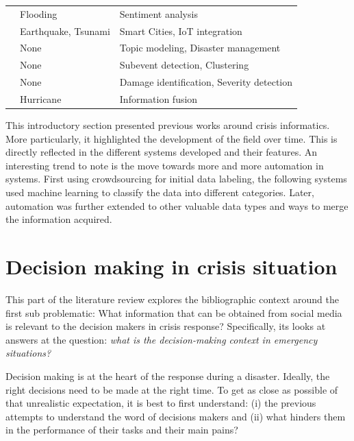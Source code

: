\begin{table}[bp]
\begin{tabular}{m{} m{} m{}}
        \cite{raginiBigDataAnalytics2018}               & Flooding              & Sentiment analysis                                       \\
        \cite{shahDisasterResilientSmart2019}           & Earthquake, Tsunami   & Smart Cities, IoT integration                            \\
        \cite{grunder-fahrerTopicsTopicalPhases2018}    & None                  & Topic modeling, Disaster management                      \\
        \cite{wuStreamExplorerMultiStageSystem2018}     & None                  & Subevent detection, Clustering                           \\
        \cite{agarwalCrisisDIASMultimodalDamage2020}    & None                  & Damage identification, Severity detection                \\
        \cite{alamDescriptiveVisualSummaries2020}       & Hurricane             & Information fusion                                       \\
        \bottomrule
    \end{tabular}
    \label{table:crisis-informatic-main-articles}
\end{table}

This introductory section presented previous works around crisis informatics.
More particularly, it highlighted the development of the field over time.
This is directly reflected in the different systems developed and their features.
An interesting trend to note is the move towards more and more automation in systems.
First using crowdsourcing for initial data labeling, the following systems used machine learning to classify the data into different categories.
Later, automation was further extended to other valuable data types and ways to merge the information acquired.

\section{Decision making in crisis situation}
This part of the literature review explores the bibliographic context around the first sub problematic: What information that can be obtained from social media is relevant to the decision makers in crisis response?
Specifically, its looks at answers at the question: \emph{what is the decision-making context in emergency situations?}

Decision making is at the heart of the response during a disaster.
Ideally, the right decisions need to be made at the right time.
To get as close as possible of that unrealistic expectation, it is best to first
understand: (i) the previous attempts to understand the word of decisions makers and
(ii) what hinders them in the performance of their tasks and their main pains?

